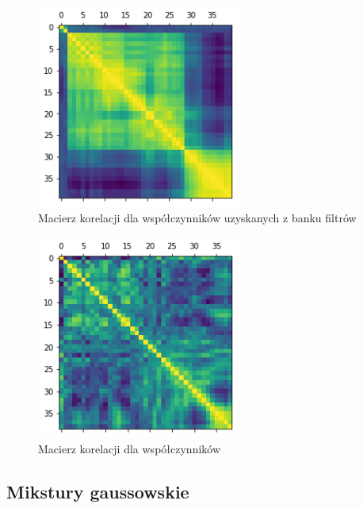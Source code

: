 \begin{figure}[H]
    \centering
    \includegraphics[width=0.6\textwidth]{images/2_1_f_correlation_matrix_banks}
    \caption{Macierz korelacji dla współczynników uzyskanych z banku filtrów}
    \label{fig:2_1_f_correlation_matrix_banks}
\end{figure}

\begin{figure}[H]
    \centering
    \includegraphics[width=0.6\textwidth]{images/2_1_g_correlation_matrix_mfcc}
    \caption{Macierz korelacji dla współczynników }
    \label{fig:2_1_g_correlation_matrix_mfcc}
\end{figure}

\subsection{Mikstury gaussowskie}\label{sec:gmm}

